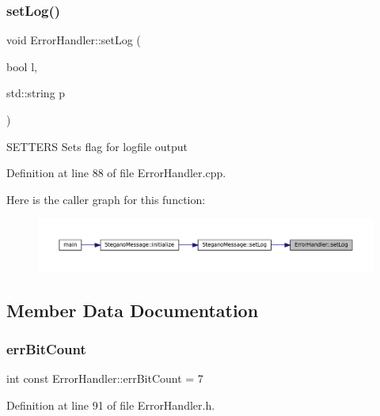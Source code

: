 \subsubsection{\texorpdfstring{setLog()}{setLog()}}
{\footnotesize\ttfamily void Error\+Handler\+::set\+Log (\begin{DoxyParamCaption}\item[{bool}]{l,  }\item[{std\+::string}]{p }\end{DoxyParamCaption})}

S\+E\+T\+T\+E\+RS Sets flag for logfile output 

Definition at line 88 of file Error\+Handler.\+cpp.

Here is the caller graph for this function\+:\nopagebreak
\begin{figure}[H]
\begin{center}
\leavevmode
\includegraphics[width=350pt]{classErrorHandler_aa79cfd994939c238b85ad021ea6bbe05_icgraph}
\end{center}
\end{figure}


\subsection{Member Data Documentation}
\mbox{\label{classErrorHandler_ae4e30eb033a9a5e2a04008a8be48ad67}} 
\subsubsection{\texorpdfstring{errBitCount}{errBitCount}}
{\footnotesize\ttfamily int const Error\+Handler\+::err\+Bit\+Count = 7\hspace{0.3cm}{\ttfamily [static]}}



Definition at line 91 of file Error\+Handler.\+h.

\mbox{\label{classErrorHandler_aaca2b9c33a1ad2bcc5d311cb4e5ca8f8}} 
